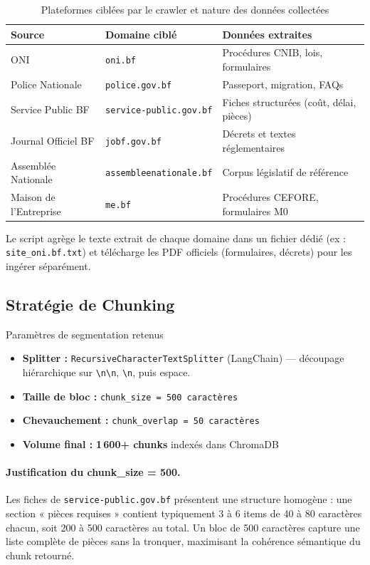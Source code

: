 \documentclass[12pt, a4paper]{article}
\begin{document}
\begin{table}[h!]
\centering
\renewcommand{\arraystretch}{1.4}
\begin{tabular}{@{}lll@{}}
\toprule
\textbf{Source} & \textbf{Domaine ciblé} & \textbf{Données extraites} \\
\midrule
ONI & \texttt{oni.bf} & Procédures CNIB, lois, formulaires \\
Police Nationale & \texttt{police.gov.bf} & Passeport, migration, FAQs \\
Service Public BF & \texttt{service-public.gov.bf} & Fiches structurées (coût, délai, pièces) \\
Journal Officiel BF & \texttt{jobf.gov.bf} & Décrets et textes réglementaires \\
Assemblée Nationale & \texttt{assembleenationale.bf} & Corpus législatif de référence \\
Maison de l'Entreprise & \texttt{me.bf} & Procédures CEFORE, formulaires M0 \\
\bottomrule
\end{tabular}
\caption{Plateformes ciblées par le crawler et nature des données collectées}
\end{table}

Le script agrège le texte extrait de chaque domaine dans un fichier dédié (ex : \texttt{site\_oni.bf.txt}) et télécharge les PDF officiels (formulaires, décrets) pour les ingérer séparément.


\subsection{Stratégie de Chunking}

\begin{infobox}{Paramètres de segmentation retenus}
\begin{itemize}[noitemsep]
  \item \textbf{Splitter :} \texttt{RecursiveCharacterTextSplitter} (LangChain) — découpage hiérarchique sur \verb|\n\n|, \verb|\n|, puis espace.
  \item \textbf{Taille de bloc :} \texttt{chunk\_size = 500 caractères}
  \item \textbf{Chevauchement :} \texttt{chunk\_overlap = 50 caractères}
  \item \textbf{Volume final :} \textbf{1\,600+ chunks} indexés dans ChromaDB
\end{itemize}
\end{infobox}

\paragraph{Justification du chunk\_size = 500.}
Les fiches de \texttt{service-public.gov.bf} présentent une structure homogène : une section « pièces requises » contient typiquement 3 à 6 items de 40 à 80 caractères chacun, soit 200 à 500 caractères au total. Un bloc de 500 caractères capture une liste complète de pièces sans la tronquer, maximisant la cohérence sémantique du chunk retourné.
\end{document}
